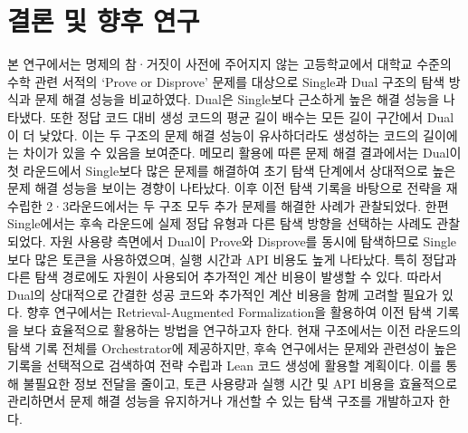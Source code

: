 \documentclass[a4paper,9pt,twocolumn]{extarticle}
\begin{document}
\section{결론 및 향후 연구}


본 연구에서는 명제의 참·거짓이 사전에 주어지지 않는 고등학교에서 대학교 수준의 수학 관련 서적의 ‘Prove or Disprove’ 문제를 대상으로 Single과 Dual 구조의 탐색 방식과 문제 해결 성능을 비교하였다. Dual은 Single보다 근소하게 높은 해결 성능을 나타냈다. 또한 정답 코드 대비 생성 코드의 평균 길이 배수는 모든 길이 구간에서 Dual이 더 낮았다. 이는 두 구조의 문제 해결 성능이 유사하더라도 생성하는 코드의 길이에는 차이가 있을 수 있음을 보여준다. 메모리 활용에 따른 문제 해결 결과에서는 Dual이 첫 라운드에서 Single보다 많은 문제를 해결하여 초기 탐색 단계에서 상대적으로 높은 문제 해결 성능을 보이는 경향이 나타났다. 이후 이전 탐색 기록을 바탕으로 전략을 재수립한 2·3라운드에서는 두 구조 모두 추가 문제를 해결한 사례가 관찰되었다. 한편 Single에서는 후속 라운드에 실제 정답 유형과 다른 탐색 방향을 선택하는 사례도 관찰되었다. 자원 사용량 측면에서 Dual이 Prove와 Disprove를 동시에 탐색하므로 Single보다 많은 토큰을 사용하였으며, 실행 시간과 API 비용도 높게 나타났다. 특히 정답과 다른 탐색 경로에도 자원이 사용되어 추가적인 계산 비용이 발생할 수 있다. 따라서 Dual의 상대적으로 간결한 성공 코드와 추가적인 계산 비용을 함께 고려할 필요가 있다.
향후 연구에서는 Retrieval-Augmented Formalization을 활용하여 이전 탐색 기록을 보다 효율적으로 활용하는 방법을 연구하고자 한다. 현재 구조에서는 이전 라운드의 탐색 기록 전체를 Orchestrator에 제공하지만, 후속 연구에서는 문제와 관련성이 높은 기록을 선택적으로 검색하여 전략 수립과 Lean 코드 생성에 활용할 계획이다. 이를 통해 불필요한 정보 전달을 줄이고, 토큰 사용량과 실행 시간 및 API 비용을 효율적으로 관리하면서 문제 해결 성능을 유지하거나 개선할 수 있는 탐색 구조를 개발하고자 한다.
\FloatBarrier
\end{document}
